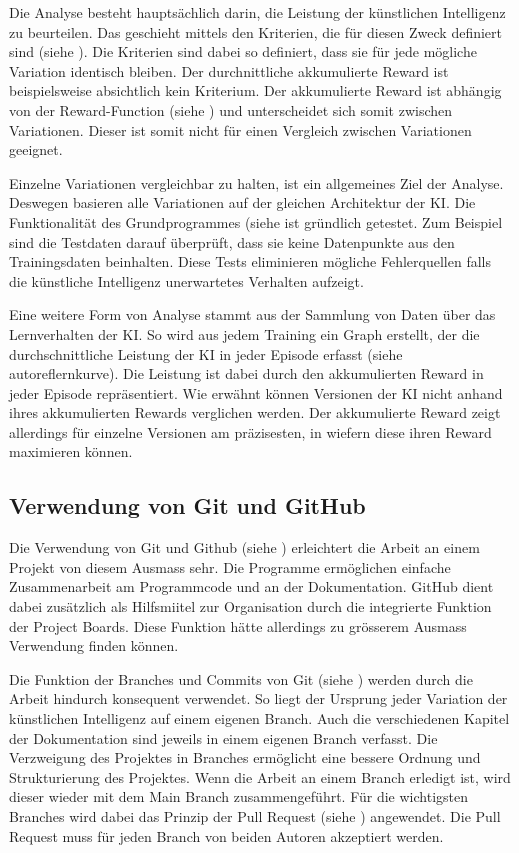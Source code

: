 Die Analyse besteht hauptsächlich darin, die Leistung der künstlichen
Intelligenz zu beurteilen. Das geschieht mittels den Kriterien, die für diesen
Zweck definiert sind (siehe ). Die Kriterien sind dabei so
definiert, dass sie für jede mögliche Variation identisch bleiben. Der
durchnittliche akkumulierte Reward ist beispielsweise absichtlich kein
Kriterium. Der akkumulierte Reward  ist abhängig von der Reward-Function (siehe
) und unterscheidet sich somit zwischen Variationen.
Dieser ist somit nicht für einen Vergleich zwischen Variationen geeignet.

Einzelne Variationen vergleichbar zu halten, ist ein allgemeines Ziel der 
Analyse. Deswegen basieren alle Variationen auf der gleichen Architektur der KI.
Die Funktionalität des Grundprogrammes (siehe  ist
gründlich getestet. Zum Beispiel sind die Testdaten darauf überprüft, dass sie
keine Datenpunkte aus den Trainingsdaten beinhalten. Diese Tests eliminieren
mögliche Fehlerquellen falls die künstliche Intelligenz unerwartetes Verhalten
aufzeigt.

Eine weitere Form von Analyse stammt aus der Sammlung von Daten über das
Lernverhalten der KI. So wird aus jedem Training ein Graph erstellt, der die
durchschnittliche Leistung der KI in jeder Episode erfasst (siehe
autoref{lernkurve}). Die Leistung ist dabei durch den akkumulierten Reward in
jeder Episode repräsentiert. Wie erwähnt können Versionen der KI nicht anhand
ihres akkumulierten Rewards verglichen werden. Der akkumulierte Reward zeigt
allerdings für einzelne Versionen am präzisesten, in wiefern diese ihren Reward
maximieren können.


\subsection{Verwendung von Git und GitHub}
\label{sub:d_reflex_git}
Die Verwendung von Git und Github (siehe ) erleichtert die
Arbeit an einem Projekt von diesem Ausmass sehr. Die Programme ermöglichen
einfache Zusammenarbeit am Programmcode und an der Dokumentation. GitHub dient
dabei zusätzlich als Hilfsmiitel zur Organisation durch die integrierte Funktion
der Project Boards. Diese Funktion hätte allerdings zu grösserem Ausmass
Verwendung finden können.

Die Funktion der Branches und Commits von Git (siehe )
werden durch die Arbeit hindurch konsequent verwendet. So liegt der Ursprung
jeder Variation der künstlichen Intelligenz auf einem eigenen Branch. Auch die
verschiedenen Kapitel der Dokumentation sind jeweils in einem eigenen Branch
verfasst. Die Verzweigung des Projektes in Branches ermöglicht eine bessere
Ordnung und Strukturierung des Projektes. Wenn die Arbeit an einem Branch
erledigt ist, wird dieser wieder mit dem Main Branch zusammengeführt. Für die
wichtigsten Branches wird dabei das Prinzip der Pull Request (siehe
) angewendet. Die Pull Request muss für jeden Branch von
beiden Autoren akzeptiert werden.

